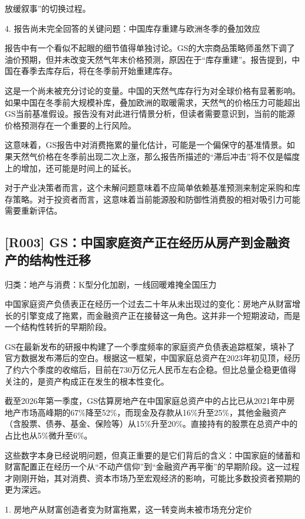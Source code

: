 \documentclass[11pt]{ctexart}
\begin{document}
放缓叙事”的切换过程。

4. 报告尚未完全回答的关键问题：中国库存重建与欧洲冬季的叠加效应

报告中有一个看似不起眼的细节值得单独讨论。GS的大宗商品策略师虽然下调了油价预期，但并未改变天然气年末价格预测，原因在于“库存重建”。报告提到，中国在春季去库存后，将在冬季前开始重建库存。

这是一个尚未被充分讨论的变量。中国的天然气库存行为对全球价格有显著影响。如果中国在冬季前大规模补库，叠加欧洲的取暖需求，天然气的价格压力可能超出GS当前基准假设。报告没有对此进行情景分析，但读者需要意识到，当前的能源价格预测存在一个重要的上行风险。

这意味着，GS报告中对消费拖累的量化估计，可能是一个偏保守的基准情景。如果天然气价格在冬季前出现二次上涨，那么报告所描述的“滞后冲击”将不仅是幅度上的增加，还可能是时间上的延长。

对于产业决策者而言，这个未解问题意味着不应简单依赖基准预测来制定采购和库存策略。对于投资者而言，这意味着当前能源股和防御性消费股的相对吸引力可能需要重新评估。

\subsection{[R003] GS：中国家庭资产正在经历从房产到金融资产的结构性迁移}
{\small\color{refgray}归类：地产与消费：K型分化加剧，一线回暖难掩全国压力}

中国家庭资产负债表正在经历一个过去二十年从未出现过的变化：房地产从财富增长的引擎变成了拖累，而金融资产正在接替这一角色。这并非一个短期波动，而是一个结构性转折的早期阶段。

GS在最新发布的研报中构建了一个季度频率的家庭资产负债表追踪框架，填补了官方数据发布滞后的空白。根据这一框架，中国家庭总资产在2023年初见顶，经历了约六个季度的收缩后，目前在730万亿元人民币左右企稳。但比总量企稳更值得关注的，是资产构成正在发生的根本性变化。

截至2026年第一季度，GS估算房地产在中国家庭总资产中的占比已从2021年中房地产市场高峰期的67\%降至52\%，而现金及存款从16\%升至25\%，其他金融资产（含股票、债券、基金、保险等）从15\%升至20\%。直接持有的股票在总资产中的占比也从5\%微升至6\%。

这些数字本身已经说明问题，但真正重要的是它们背后的含义：中国家庭的储蓄和财富配置正在经历一个从“不动产信仰”到“金融资产再平衡”的早期阶段。这一过程才刚刚开始，其对消费、资本市场乃至宏观经济的影响，可能比多数投资者预期的更为深远。

1. 房地产从财富创造者变为财富拖累，这一转变尚未被市场充分定价
\end{document}
